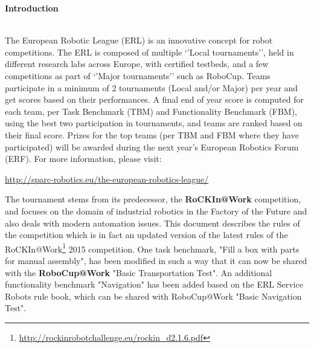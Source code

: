 
\thispagestyle{empty}
\textbf{\center \Large 
 		Introduction}
 		
%	
%
%
\vspace*{0.8cm}	
\noindent 
\vspace*{0.2cm}
\\
\noindent
The European Robotic League (ERL) is an innovative concept for robot competitions. The ERL is composed of multiple ‘’Local tournaments’’, held in different research labs across Europe, with certified testbeds, and a few competitions as part of ‘’Major tournaments’’ such as RoboCup. Teams participate in a minimum of 2 tournaments (Local and/or Major) per year and get scores based on their performances. A final end of year score is computed for each team, per Task Benchmark (TBM) and Functionality Benchmark (FBM), using the best two participation in tournaments, and teams are ranked based on their final score. Prizes for the top teams (per TBM and FBM where they have participated) will be awarded during the next year’s European Robotics Forum (ERF).  For more information, please visit:

\begin{center}
\url{http://sparc-robotics.eu/the-european-robotics-league/}
\end{center}

\noindent
The \textbf{\erlir} tournament stems from its predecessor, the \textbf{RoCKIn@Work} competition, and focuses on the domain of industrial robotics in the Factory of the Future and also deals with modern automation issues. 
This document describes the rules of the \erlir competition which is in fact an updated version of the latest rules of the RoCKIn@Work\footnote{\url{http://rockinrobotchallenge.eu/rockin_d2.1.6.pdf}} 2015 competition. One task benchmark, "Fill a box with parts for manual assembly", has been modified in such a way that it can now be shared with the \textbf{RoboCup@Work} "Basic Transportation Test". An additional functionality benchmark "Navigation" has been added based on the ERL Service Robots rule book, which can be shared with RoboCup@Work "Basic Navigation Test".

